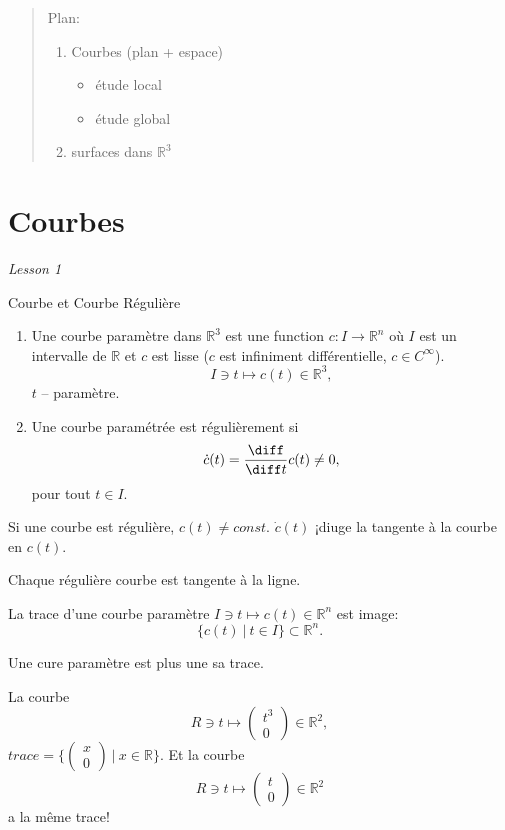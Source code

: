 \tableofcontents

\begin{abstract}
Plan:
\begin{enumerate}
\item Courbes (plan + espace)
\begin{itemize}
\item étude local
\item étude global
\end{itemize}
\item surfaces dans $\mathbb{R}^3$
\end{enumerate}\end{abstract}
 
\section{Courbes}

\emph{Lesson 1}

\theoremstyle{definition}
\begin{definition}{Courbe et Courbe Régulière}
\begin{enumerate}
\item Une courbe paramètre dans $\mathbb{R}^3$ est une function $c:I\rightarrow \mathbb{R}^n$ où $I$ est un intervalle de $\mathbb{R}$ et $c$ est lisse ($c$ est infiniment différentielle, $ c \in C^\infty$).
$$I\ni t\mapsto c(t)\in \mathbb{R}^3,$$
$t$ -- paramètre.
\item Une courbe paramétrée est régulièrement si
$$\dot{c}(t) = \frac{\diff}{\diff t}c(t)\neq 0,$$
pour tout $t\in I$.
\end{enumerate}
\end{definition}

Si une courbe est régulière, $c(t)\neq const$. $\dot{c}(t)$ ¡diuge la tangente à la courbe en $c(t)$.

Chaque régulière courbe est tangente à la ligne.

\begin{definition} La trace d'une courbe paramètre $I\ni t \mapsto c(t)\in \mathbb{R}^n$ est image:
$$\{c(t)\ |\ t\in I\} \subset \mathbb{R}^n.$$
\end{definition}

Une cure paramètre est plus une sa trace.

La courbe $$R\ni t \mapsto \left( \begin{array}{c} t^3 \\ 0 \end{array} \right) \in \mathbb{R}^2,$$ 
$trace = \{ \left( \begin{array}{c} x \\ 0 \end{array} \right)\ |\ x\in \mathbb{R} \}$. Et la courbe $$R\ni t \mapsto \left( \begin{array}{c} t \\ 0 \end{array} \right) \in \mathbb{R}^2$$ a la même trace!

